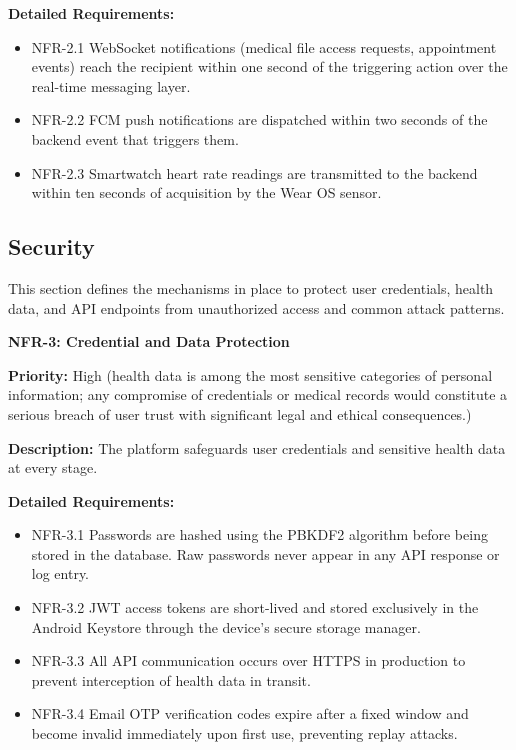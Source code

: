 \textbf{Detailed Requirements:}
\begin{itemize}
    \item NFR-2.1 \; WebSocket notifications (medical file access requests, appointment
    events) reach the recipient within one second of the triggering action over the real-time messaging layer.
    \item NFR-2.2 \; FCM push notifications are dispatched within two seconds of the
    backend event that triggers them.
    \item NFR-2.3 \; Smartwatch heart rate readings are transmitted to the backend
    within ten seconds of acquisition by the Wear OS sensor.
\end{itemize}

\subsection{Security}

This section defines the mechanisms in place to protect user credentials, health data,
and API endpoints from unauthorized access and common attack patterns.

\textbf{NFR-3: Credential and Data Protection}

\textbf{Priority:} High (health data is among the most sensitive categories of personal information; any compromise of credentials or medical records would constitute a serious breach of user trust with significant legal and ethical consequences.)

\textbf{Description:} The platform safeguards user credentials and sensitive health data
at every stage.

\textbf{Detailed Requirements:}
\begin{itemize}
    \item NFR-3.1 \; Passwords are hashed using the PBKDF2 algorithm before being stored in the database. Raw passwords never appear in any API response or log entry.
    \item NFR-3.2 \; JWT access tokens are short-lived and stored exclusively in the Android Keystore through the device's secure storage manager.
    \item NFR-3.3 \; All API communication occurs over HTTPS in production to
    prevent interception of health data in transit.
    \item NFR-3.4 \; Email OTP verification codes expire after a fixed window and
    become invalid immediately upon first use, preventing replay attacks.
\end{itemize}

